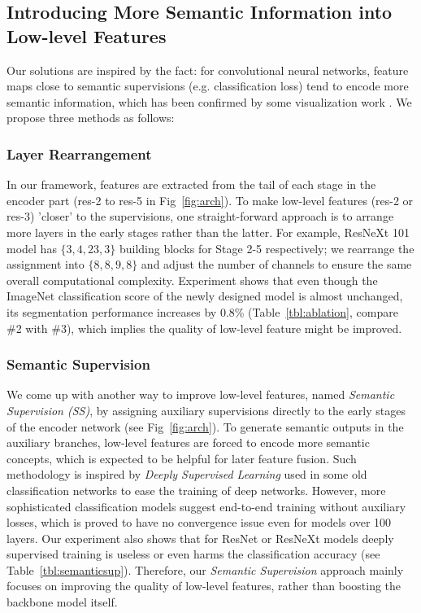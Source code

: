 \documentclass[runningheads]{llncs}
\begin{document}
\subsection{Introducing More Semantic Information into Low-level Features}
\label{sec:tolowlevel}

Our solutions are inspired by the fact: for convolutional neural networks, feature maps close to semantic supervisions (e.g. classification loss) tend to encode more semantic information, which has been confirmed by some visualization work \cite{zeiler2014visualizing}. We propose three methods as follows:

\subsubsection{Layer Rearrangement}
\label{sec:lr}

In our framework, features are extracted from the tail of each stage in the encoder part (res-2 to res-5 in Fig~\ref{fig:arch}). To make low-level features (res-2 or res-3) 'closer' to the supervisions, one straight-forward approach is to arrange more layers in the early stages rather than the latter. For example, ResNeXt 101 \cite{Xie2016Aggregated} model has $\{3,4,23,3\}$ building blocks for Stage 2-5 respectively; we rearrange the assignment into $\{8,8,9,8\}$ and adjust the number of channels to ensure the same overall computational complexity. Experiment shows that even though the ImageNet classification score of the newly designed model is almost unchanged, its segmentation performance increases by 0.8\% (Table~\ref{tbl:ablation}, compare \#2 with \#3), which implies the quality of low-level feature might be improved.  


\subsubsection{Semantic Supervision}
\label{sec:semanticsupervision}

We come up with another way to improve low-level features, named \emph{Semantic Supervision (SS)}, by assigning auxiliary supervisions directly to the early stages of the encoder network (see Fig~\ref{fig:arch}). To generate semantic outputs in the auxiliary branches, low-level features are forced to encode more semantic concepts, which is expected to be helpful for later feature fusion. Such methodology is inspired by \emph{Deeply Supervised Learning} used in some old classification networks \cite{Lee2014Deeply,Szegedy2015Going} to ease the training of deep networks. However, more sophisticated classification models \cite{szegedy2016rethinking,szegedy2017inception,He2016Deep,He2016Identity,hu2017squeeze,Xie2016Aggregated} suggest end-to-end training without auxiliary losses, which is proved to have no convergence issue even for models over 100 layers. Our experiment also shows that for ResNet or ResNeXt models deeply supervised training is useless or even harms the classification accuracy (see Table~\ref{tbl:semanticsup}). Therefore, our \emph{Semantic Supervision} approach mainly focuses on improving the quality of low-level features, rather than boosting the backbone model itself.
\end{document}
